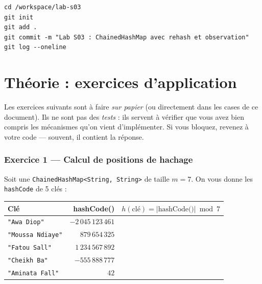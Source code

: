 \documentclass[11pt,a4paper]{article}
\begin{document}
\begin{lstlisting}[style=bash]
cd /workspace/lab-s03
git init
git add .
git commit -m "Lab S03 : ChainedHashMap avec rehash et observation"
git log --oneline
\end{lstlisting}

\newpage
\part{Théorie : exercices d'application}

\begin{infobox}
Les exercices suivants sont à faire \emph{sur papier} (ou directement dans les cases de ce document). Ils ne sont pas des \emph{tests} : ils servent à vérifier que vous avez bien compris les mécanismes qu'on vient d'implémenter. Si vous bloquez, revenez à votre code --- souvent, il contient la réponse.
\end{infobox}

\section{Exercice 1 --- Calcul de positions de hachage}

Soit une \texttt{ChainedHashMap<String, String>} de taille $m = 7$. On vous donne les \texttt{hashCode} de 5 clés :

\medskip

\begin{center}
\renewcommand{\arraystretch}{1.4}
\begin{tabular}{|l|r|c|}
\hline
\textbf{Clé} & \textbf{hashCode()} & \textbf{$h(\text{clé}) = |\text{hashCode()}| \bmod 7$} \\
\hline
\texttt{"Awa Diop"} & $-2\,045\,123\,461$ & \rule{0pt}{0.7cm}\hspace{3cm} \\
\hline
\texttt{"Moussa Ndiaye"} & $879\,654\,325$ & \rule{0pt}{0.7cm} \\
\hline
\texttt{"Fatou Sall"} & $1\,234\,567\,892$ & \rule{0pt}{0.7cm} \\
\hline
\texttt{"Cheikh Ba"} & $-555\,888\,777$ & \rule{0pt}{0.7cm} \\
\hline
\texttt{"Aminata Fall"} & $42$ & \rule{0pt}{0.7cm} \\
\hline
\end{tabular}
\end{center}
\end{document}
